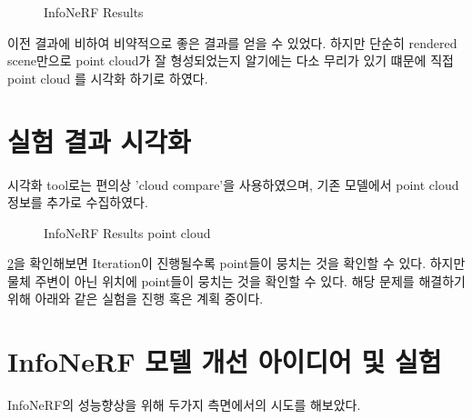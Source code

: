 \documentclass{vipweekly}
\begin{document}
\begin{figure}[h]
    \caption{InfoNeRF Results}
    \label{fig:Results_s}
\end{figure}

이전 결과에 비하여 비약적으로 좋은 결과를 얻을 수 있었다. 
하지만 단순히 rendered scene만으로 point cloud가 잘 형성되었는지 
알기에는 다소 무리가 있기 떄문에 직접 point cloud 를 시각화 하기로 하였다.

\section{실험 결과 시각화}

시각화 tool로는 편의상 'cloud compare'을 사용하였으며, 
기존 모델에서 point cloud 정보를 추가로 수집하였다.

\newpage

\begin{figure}[h]
    \centering
    \hfill
    \hfill
    \caption{InfoNeRF Results point cloud}
    \label{fig:Results_pc}
\end{figure}

\ref{fig:Results_pc}을 확인해보면 Iteration이 진행될수록 point들이 뭉치는 것을 확인할 수 있다.
하지만 물체 주변이 아닌 위치에 point들이 뭉치는 것을 확인할 수 있다. 
해당 문제를 해결하기 위해 아래와 같은 실험을 진행 혹은 계획 중이다.

\section{InfoNeRF 모델 개선 아이디어 및 실험}

InfoNeRF의 성능향상을 위해 두가지 측면에서의 시도를 해보았다.
\end{document}
